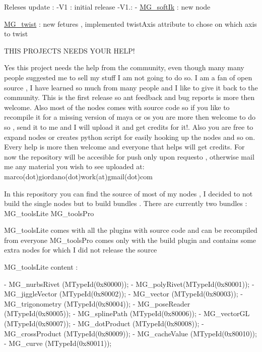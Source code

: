 Releses update \-: -\/\-V1 \-: initial release -\/\-V1.\-: -\/ \hyperlink{class_m_g__soft_ik}{M\-G\-\_\-soft\-Ik} \-: new node
\begin{DoxyItemize}
\item \hyperlink{class_m_g__twist}{M\-G\-\_\-twist} \-: new fetures , implemented twist\-Axis attribute to chose on which axis to twist
\end{DoxyItemize}

T\-H\-I\-S P\-R\-O\-J\-E\-C\-T\-S N\-E\-E\-D\-S Y\-O\-U\-R H\-E\-L\-P!

Yes this project needs the help from the community, even though many many people suggested me to sell my stuff I am not going to do so. I am a fan of open source , I have learned so much from many people and I like to give it back to the community. This is the first release so ant feedback and bug reports is more then welcome. Also most of the nodes comes with source code so if you like to recompile it for a missing version of maya or os you are more then welcome to do so , send it to me and I will upload it and get credits for it!. Also you are free to expand nodes or creates python script for easily hooking up the nodes and so on. Every help is more then welcome and everyone that helps will get credits. For now the repository will be accesible for push only upon requesto , otherwise mail me any material you wish to see uploaded at\-: marco(dot)giordano(dot)work(at)gmail(dot)com

In this repository you can find the source of most of my nodes , I decided to not build the single nodes but to build bundles . There are currently two bundles \-: M\-G\-\_\-tools\-Lite M\-G\-\_\-tools\-Pro

M\-G\-\_\-tools\-Lite comes with all the plugins with source code and can be recompiled from everyone M\-G\-\_\-tools\-Pro comes only with the build plugin and contains some extra nodes for which I did not release the source

M\-G\-\_\-tools\-Lite content \-: \begin{DoxyVerb}- MG_nurbsRivet (MTypeId(0x80000));
- MG_polyRivet(MTypeId(0x80001)); 
- MG_jiggleVector  (MTypeId(0x80002));
- MG_vector  (MTypeId(0x80003));
- MG_trigonometry  (MTypeId(0x80004));
- MG_poseReader  (MTypeId(0x80005)); 
- MG_splinePath  (MTypeId(0x80006)); 
- MG_vectorGL (MTypeId(0x80007)); 
- MG_dotProduct  (MTypeId(0x80008)); 
- MG_crossProduct  (MTypeId(0x80009)); 
- MG_cacheValue  (MTypeId(0x80010)); 
- MG_curve  (MTypeId(0x80011));
\end{DoxyVerb}


